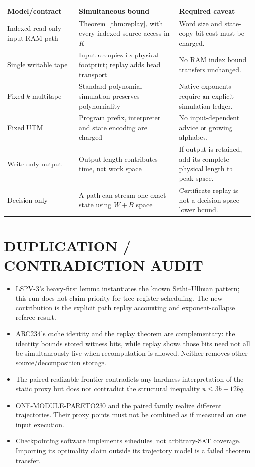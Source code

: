\documentclass[11pt]{article}
\begin{document}
\begin{longtable}{p{.19\linewidth}p{.34\linewidth}p{.36\linewidth}}
\toprule
Model/contract & Simultaneous bound & Required caveat\\
\midrule
Indexed read-only-input RAM path & Theorem~\ref{thm:replay}, with every indexed source access in $K$ &
Word size and state-copy bit cost must be charged.\\
Single writable tape & Input occupies its physical footprint; replay adds head transport &
No RAM index bound transfers unchanged.\\
Fixed-$k$ multitape & Standard polynomial simulation preserves polynomiality &
Native exponents require an explicit simulation ledger.\\
Fixed UTM & Program prefix, interpreter and state encoding are charged &
No input-dependent advice or growing alphabet.\\
Write-only output & Output length contributes time, not work space &
If output is retained, add its complete physical length to peak space.\\
Decision only & A path can stream one exact state using $W+B$ space &
Certificate replay is not a decision-space lower bound.\\
\bottomrule
\end{longtable}

\section{DUPLICATION / CONTRADICTION AUDIT}

\begin{itemize}
\item LSPV-3's heavy-first lemma instantiates the known Sethi--Ullman pattern; this run does not claim
priority for tree register scheduling.  The new contribution is the explicit path replay accounting
and exponent-collapse referee result.
\item ARC234's cache identity and the replay theorem are complementary: the identity bounds stored
witness bits, while replay shows those bits need not all be simultaneously live when recomputation is
allowed.  Neither removes other source/decomposition storage.
\item The paired realizable frontier contradicts any hardness interpretation of the static proxy but
does not contradict the structural inequality $n\le3b+12bq$.
\item ONE-MODULE-PARETO230 and the paired family realize different trajectories.  Their proxy points
must not be combined as if measured on one input execution.
\item Checkpointing software implements schedules, not arbitrary-SAT coverage.  Importing its
optimality claim outside its trajectory model is a failed theorem transfer.
\end{itemize}
\end{document}
